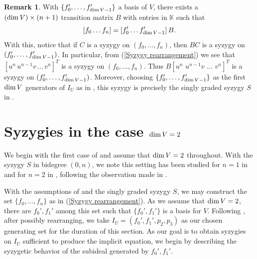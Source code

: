 \documentclass[reqno]{amsart}
\numberwithin{equation}{section}
\theoremstyle{definition}
\newtheorem{rem}[thm]{Remark}
\def\K{\mathbb{K}}
\def\dim{\mathop{\rm dim}}
\begin{document}
\begin{rem}\label{B transition matrix and syzygies remark}
With $\{f_0',\ldots,f_{\dim V-1}'\}$ a basis of $V$, there exists a $(\dim V) \times(n+1)$ transition matrix $B$ with entries in $\K$ such that 
\begin{equation}\label{B transition matrix equation}
[f_0\ldots f_n] = [f_0'\ldots f_{ \dim V -1}']\, B. 
\end{equation}
With this, notice that if $C$ is a syzygy on $(f_0,\ldots,f_n)$, then $BC$ is a syzygy on $(f_0',\ldots, f_{\dim V -1}')$. In particular, from (\ref{Syzygy rearrangement}) we see that $[u^n\, u^{n-1}v\, \ldots \,v^n]^T$ is a syzygy on $(f_0,\ldots,f_n)$. Thus $B [u^n\,\, u^{n-1}v\,\, \ldots \,\,v^n]^T$ is a syzygy on $(f_0',\ldots, f_{\dim V -1}')$. Moreover, choosing $\{f_0',\ldots, f_{\dim V -1}'\}$ as the first $\dim V$ generators of $I_U$ as in , this syzygy is precisely the singly graded syzygy $S$ in .
\end{rem}













\section{Syzygies in the case $\dim V=2$}\label{dim 2 section}

We begin with the first case of  and assume that $\dim V=2$ throughout. With the syzygy $S$ in bidegree $(0,n)$, we note this setting has been studied for $n=1$ in \cite{DS16} and for $n=2$ in \cite{Weaver25}, following the observation made in . 


With the assumptions of  and the singly graded syzygy $S$, we may construct the set $\{f_0,\ldots,f_n\}$ as in (\ref{Syzygy rearrangement}). As we assume that $\dim V=2$, there are $f_0', f_1'$ among this set such that $\{f_0',f_1'\}$ is a basis for $V$. Following , after possibly rearranging, we take $I_U = (f_0',f_1',p_2,p_3)$ as our chosen generating set for the duration of this section. As our goal is to obtain syzygies on $I_U$ sufficient to produce the implicit equation, we begin by describing the syzygetic behavior of the subideal generated by $f_0',f_1'$.
\end{document}
